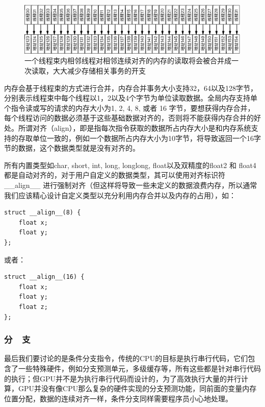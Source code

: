 \begin{figure}
	\begin{fullwidth}
		\includegraphics[width=1.0\thewidth]{figures/rp/coalescing}
		\caption{一个线程束内相邻线程对相邻连续对齐的内存的读取将会被合并成一次读取，大大减少存储相关事务的开支}
		\label{f:rp-coalescing}
	\end{fullwidth}
\end{figure}

内存会基于线程束的方式进行合并，内存合并事务大小支持32，64以及128字节，分别表示线程束中每个线程以1，2以及4个字节为单位读取数据。全局内存支持单个指令读或写的请求的内存大小为1, 2, 4, 8, 或者 16 字节，要想获得内存合并，每个线程访问的数据必须基于这些基础数据对齐的，否则将不能获得内存合并的好处。所谓对齐（align），即是指每次指令获取的数据所占内存大小是和内存系统支持的存取单位一致的，例如一个数据所占内存大小为10字节，将导致返回一个16字节的数据，这个数据类型就是没有对齐的。

所有内置类型如char, short, int, long, longlong, float以及双精度的float2 和 float4都是自动对齐的，对于用户自定义的数据类型，其可以使用对齐标识符\_\_align\_\_ 进行强制对齐（但这样将导致一些未定义的数据浪费内存，所以通常我们应该精心设计自定义类型以充分利用内存合并以及内存的占用），如：

\begin{lstlisting}
struct __align__(8) {
    float x;
    float y; 
};
\end{lstlisting}

或者：
\begin{lstlisting}
struct __align__(16) {
	float x;
	float y;
	float z; 
};
\end{lstlisting}






\subsubsection{分~~支}
最后我们要讨论的是条件分支指令，传统的CPU的目标是执行串行代码，它们包含了一些特殊硬件，例如分支预测单元，多级缓存等，所有这些都是针对串行代码的执行；但GPU并不是为执行串行代码而设计的，为了高效执行大量的并行计算，GPU并没有像CPU那么复杂的硬件实现的分支预测功能，同前面的变量内存位置分配，数据的连续对齐一样，条件分支同样需要程序员小心地处理。


